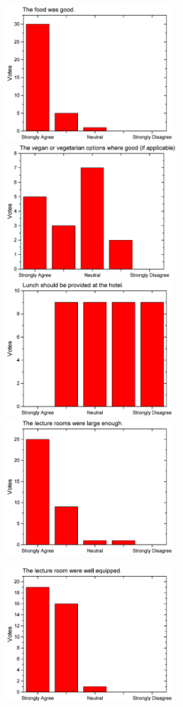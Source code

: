 \begin{figure}[H]
  \centering
  \begin{minipage}{.48\linewidth}
    \centering
      {\includegraphics[height=50mm]{figures/n/Graph7.pdf}}
      {\includegraphics[height=50mm]{figures/n/Graph8.pdf}}
      {\includegraphics[height=50mm]{figures/n/Graph9.pdf}}
      {\includegraphics[height=50mm]{figures/n/Graph10.pdf}}
  \end{minipage}\quad
  \begin{minipage}{.48\linewidth}
    \centering
      {\includegraphics[height=50mm]{figures/n/Graph11.pdf}}

\end{minipage}
\end{figure}
